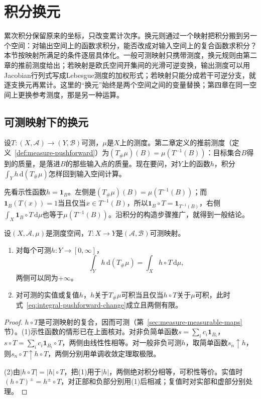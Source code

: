 \section{积分换元}
\label{sec:integral-change-of-variables}

累次积分保留原来的坐标，只改变累计次序。换元则通过一个映射把积分搬到另一个空间：对输出空间上的函数求积分，能否改成对输入空间上的复合函数求积分？本节按映射所满足的条件逐层具体化。一般可测映射只携带测度，换元规则由第二章的推前测度给出；若映射是欧氏空间开集间的光滑可逆变换，输出测度可以用Jacobian行列式写成Lebesgue测度的加权形式；若映射只能分成若干可逆分支，就逐支换元再累计。这里的“换元”始终是两个空间之间的变量替换；第四章在同一空间上更换参考测度，那是另一种运算。

\subsection{可测映射下的换元}
\label{sec:integral-pushforward-change}

设$T:(X,\mathcal A)\to(Y,\mathcal B)$可测，$\mu$是$X$上的测度。第二章定义的推前测度（定义~\ref{def:measure-pushforward}）为$(T_\#\mu)(B)=\mu(T^{-1}(B))$：目标集合$B$得到的质量，是落进$B$的那些输入点的质量。现在要问，对$Y$上的函数$h$，积分$\int_Yh\,\mathrm d(T_\#\mu)$怎样回到输入空间计算。

先看示性函数$h=\mathbf 1_B$。左侧是$(T_\#\mu)(B)=\mu(T^{-1}(B))$；而$\mathbf 1_B(T(x))=1$当且仅当$x\in T^{-1}(B)$，所以$\mathbf 1_B\circ T=\mathbf 1_{T^{-1}(B)}$，右侧$\int_X\mathbf 1_B\circ T\,\mathrm d\mu$也等于$\mu(T^{-1}(B))$。沿积分的构造步骤推广，就得到一般结论。

\begin{theorem}[推前测度的积分换元]
\label{thm:integral-pushforward-change}
设$(X,\mathcal A,\mu)$是测度空间，$T:X\to Y$是$(\mathcal A,\mathcal B)$可测映射。
\begin{enumerate}
 \item 对每个可测$h:Y\to[0,\infty]$，
 \begin{equation}
  \int_Yh\,\mathrm d(T_\#\mu)=\int_Xh\circ T\,\mathrm d\mu,
  \label{eq:integral-pushforward-change}
 \end{equation}
 两侧可以同为$+\infty$。
 \item 对可测的实值或复值$h$，$h$关于$T_\#\mu$可积当且仅当$h\circ T$关于$\mu$可积，此时式~\eqref{eq:integral-pushforward-change}成立且两侧有限。
\end{enumerate}
\end{theorem}

\begin{proof}
$h\circ T$是可测映射的复合，因而可测（第~\ref{sec:measure-measurable-maps}节）。(1)示性函数的情形已在上面核对。对非负简单函数$s=\sum_ic_i\mathbf 1_{B_i}$，$s\circ T=\sum_ic_i\mathbf 1_{B_i}\circ T$，两侧由线性性相等。对一般非负可测$h$，取简单函数$s_n\uparrow h$，则$s_n\circ T\uparrow h\circ T$，两侧分别用单调收敛定理取极限。

(2)由$|h\circ T|=|h|\circ T$，把(1)用于$|h|$，两侧绝对积分相等，可积性等价。实值时$(h\circ T)^\pm=h^\pm\circ T$，对正部和负部分别用(1)后相减；复值时对实部和虚部分别处理。
\end{proof}


